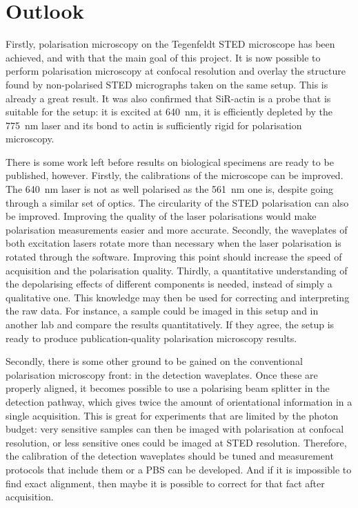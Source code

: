 
\chapter{Outlook}

Firstly, polarisation microscopy on the Tegenfeldt STED microscope has been achieved, and with that the main goal of this project. It is now possible to perform polarisation microscopy at confocal resolution and overlay the structure found by non-polarised STED micrographs taken on the same setup. This is already a great result. It was also confirmed that SiR-actin is a probe that is suitable for the setup: it is excited at 640~nm, it is efficiently depleted by the 775~nm laser and its bond to actin is sufficiently rigid for polarisation microscopy.

There is some work left before results on biological specimens are ready to be published, however. Firstly, the calibrations of the microscope can be improved. The 640~nm laser is not as well polarised as the 561~nm one is, despite going through a similar set of optics. The circularity of the STED polarisation can also be improved. Improving the quality of the laser polarisations would make polarisation measurements easier and more accurate. Secondly, the waveplates of both excitation lasers rotate more than necessary when the laser polarisation is rotated through the software. Improving this point should increase the speed of acquisition and the polarisation quality. Thirdly, a quantitative understanding of the depolarising effects of different components is needed, instead of simply a qualitative one. This knowledge may then be used for correcting and interpreting the raw data. For instance, a sample could be imaged in this setup and in another lab and compare the results quantitatively. If they agree, the setup is ready to produce publication-quality polarisation microscopy results.

Secondly, there is some other ground to be gained on the conventional polarisation microscopy front: in the detection waveplates. Once these are properly aligned, it becomes possible to use a polarising beam splitter in the detection pathway, which gives twice the amount of orientational information in a single acquisition. This is great for experiments that are limited by the photon budget: very sensitive samples can then be imaged with polarisation at confocal resolution, or less sensitive ones could be imaged at STED resolution. Therefore, the calibration of the detection waveplates should be tuned and measurement protocols that include them or a PBS can be developed. And if it is impossible to find exact alignment, then maybe it is possible to correct for that fact after acquisition.

